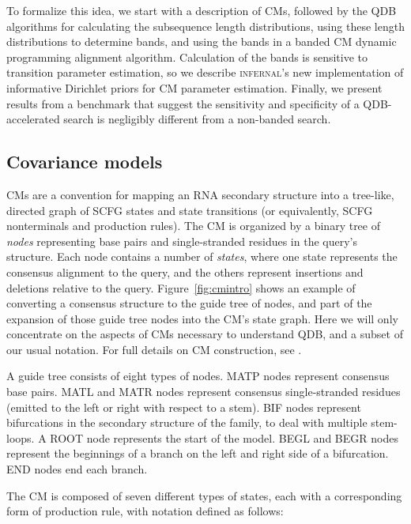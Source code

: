 \documentclass[11pt]{article}
\newif\ifdraft
\begin{document}
To formalize this idea, we start with a description of CMs, followed
by the QDB algorithms for calculating the subsequence length
distributions, using these length distributions to determine bands,
and using the bands in a banded CM dynamic programming alignment
algorithm. Calculation of the bands is sensitive to transition
parameter estimation, so we describe \textsc{infernal}'s new
implementation of informative Dirichlet priors for CM parameter
estimation. Finally, we present results from a benchmark that suggest
the sensitivity and specificity of a QDB-accelerated search is
negligibly different from a non-banded search.

\subsection{Covariance models}

CMs are a convention for mapping an RNA secondary structure into a
tree-like, directed graph of SCFG states and state transitions (or
equivalently, SCFG nonterminals and production rules). The CM is
organized by a binary tree of \emph{nodes} representing base pairs and
single-stranded residues in the query's structure.  Each node contains
a number of \emph{states}, where one state represents the consensus
alignment to the query, and the others represent insertions and
deletions relative to the query.  Figure~\ref{fig:cmintro} shows an
example of converting a consensus structure to the guide tree of
nodes, and part of the expansion of those guide tree nodes into the
CM's state graph. Here we will only concentrate on the aspects of CMs
necessary to understand QDB, and a subset of our usual notation. For
full details on CM construction, see \cite{Eddy02b,infguide03}.

\ifdraft

\fi

A guide tree consists of eight types of nodes. MATP nodes represent
consensus base pairs. MATL and MATR nodes represent consensus
single-stranded residues (emitted to the left or right with respect to
a stem). BIF nodes represent bifurcations in the secondary structure
of the family, to deal with multiple stem-loops. A ROOT node
represents the start of the model. BEGL and BEGR nodes represent the
beginnings of a branch on the left and right side of a bifurcation.
END nodes end each branch.

The CM is composed of seven different types of states, each with a
corresponding form of production rule, with notation defined as
follows:
\end{document}
